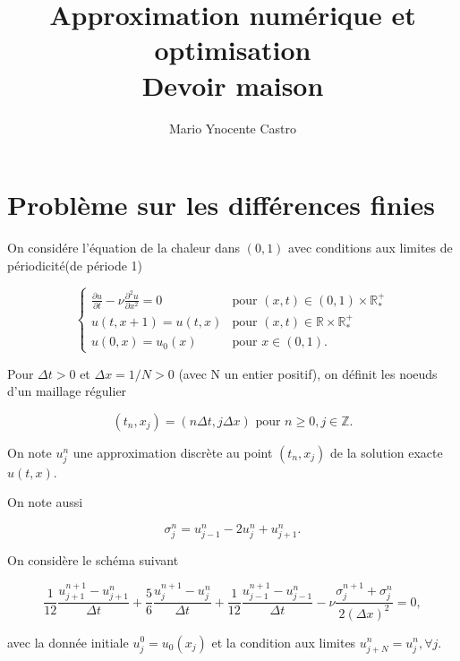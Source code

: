 \documentclass[10pt,a4paper,oneside]{article}
\begin{document}
\title{Approximation numérique et optimisation \\ Devoir maison}
\author{Mario Ynocente Castro}

\maketitle

\section{Problème sur les différences finies}

On considére l'équation de la chaleur dans $(0,1)$ avec conditions aux limites de périodicité(de période 1)

\[ \begin{cases}
\frac{\partial u}{\partial t} - \nu \frac{\partial^2 u}{\partial x^2} = 0 & \text{pour } (x,t) \in (0,1) \times \mathbb{R}^+_* \\
u(t,x + 1) = u(t,x) & \text{pour } (x,t) \in \mathbb{R} \times \mathbb{R}^+_* \\
u(0,x) = u_0(x) & \text{pour } x \in (0,1).
\end{cases} \label{eq:chaleur} \tag{1} \]

Pour $\Delta t > 0$ et $\Delta x = 1/N > 0$ (avec N un entier positif), on définit les noeuds d'un maillage régulier

\[ (t_n,x_j) = (n \Delta t,j \Delta x) \text{ pour } n \geq 0, j \in \mathbb{Z}. \]

On note $u^n_j$ une approximation discrète au point $(t_n,x_j)$ de la solution exacte $u(t,x)$.

On note aussi

\[ \sigma^n_j = u^n_{j - 1} - 2u^n_j + u^n_{j + 1}. \]

On considère le schéma suivant

\[ \frac{1}{12}\frac{u^{n+1}_{j+1} - u^{n}_{j+1}}{\Delta t} + \frac{5}{6}\frac{u^{n+1}_{j} - u^{n}_{j}}{\Delta t} + \frac{1}{12}\frac{u^{n+1}_{j-1} - u^{n}_{j-1}}{\Delta t} - \nu \frac{\sigma^{n + 1}_j + \sigma^n_j}{2(\Delta x)^2} = 0, \]

avec la donnée initiale $u^0_j = u_0(x_j)$ et la condition aux limites $u^n_{j + N} = u^n_j, \forall j$.
\end{document}
